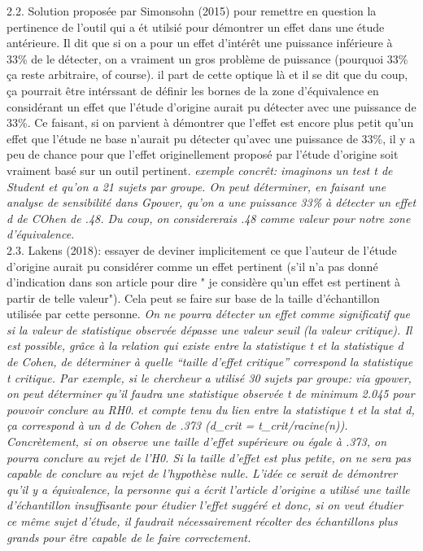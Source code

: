 \documentclass[
  english,
  man]{apa6}
\begin{document}
2.2. Solution proposée par Simonsohn (2015) pour remettre en question la pertinence de l'outil qui a ét utilsié pour démontrer un effet dans une étude antérieure. Il dit que si on a pour un effet d'intérêt une puissance inférieure à 33\% de le détecter, on a vraiment un gros problème de puissance (pourquoi 33\% ça reste arbitraire, of course). il part de cette optique là et il se dit que du coup, ça pourrait être intérssant de définir les bornes de la zone d'équivalence en considérant un effet que l'étude d'origine aurait pu détecter avec une puissance de 33\%. Ce faisant, si on parvient à démontrer que l'effet est encore plus petit qu'un effet que l'étude ne base n'aurait pu détecter qu'avec une puissance de 33\%, il y a peu de chance pour que l'effet originellement proposé par l'étude d'origine soit vraiment basé sur un outil pertinent. \emph{exemple concrêt: imaginons un test t de Student et qu'on a 21 sujets par groupe. On peut déterminer, en faisant une analyse de sensibilité dans Gpower, qu'on a une puissance 33\% à détecter un effet d de COhen de .48. Du coup, on considererais .48 comme valeur pour notre zone d'équivalence.}\\
2.3. Lakens (2018): essayer de deviner implicitement ce que l'auteur de l'étude d'origine aurait pu considérer comme un effet pertinent (s'il n'a pas donné d'indication dans son article pour dire " je considère qu'un effet est pertinent à partir de telle valeur"). Cela peut se faire sur base de la taille d'échantillon utilisée par cette personne. \emph{On ne pourra détecter un effet comme significatif que si la valeur de statistique observée dépasse une valeur seuil (la valeur critique). Il est possible, grâce à la relation qui existe entre la statistique t et la statistique d de Cohen, de déterminer à quelle ``taille d'effet critique'' correspond la statistique t critique. Par exemple, si le chercheur a utilisé 30 sujets par groupe: via gpower, on peut déterminer qu'il faudra une statistique observée t de minimum 2.045 pour pouvoir conclure au RH0. et compte tenu du lien entre la statistique t et la stat d, ça correspond à un d de Cohen de .373 (d\_crit = t\_crit/racine(n)). Concrètement, si on observe une taille d'effet supérieure ou égale à .373, on pourra conclure au rejet de l'H0. Si la taille d'effet est plus petite, on ne sera pas capable de conclure au rejet de l'hypothèse nulle. L'idée ce serait de démontrer qu'il y a équivalence, la personne qui a écrit l'article d'origine a utilisé une taille d'échantillon insuffisante pour étudier l'effet suggéré et donc, si on veut étudier ce même sujet d'étude, il faudrait nécessairement récolter des échantillons plus grands pour être capable de le faire correctement. }
\end{document}
